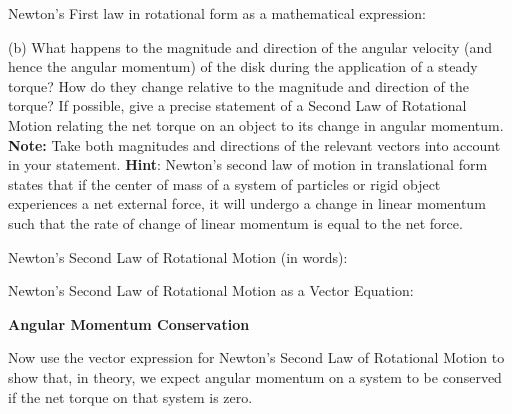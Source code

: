 Newton's First law in rotational form as a mathematical expression: 
\vspace{20mm}

(b) What happens to the magnitude and direction of the angular velocity (and
hence the angular momentum) of the disk during the application of a steady torque? How do they change relative to the magnitude and direction of the torque? If
possible, give a precise statement of a Second Law of Rotational Motion relating the net torque on an object to its change in angular momentum. \textbf{Note:}
Take both magnitudes and directions of the relevant vectors into account in
your statement. \textbf{Hint}: Newton's second law of motion in translational form states that if the center of mass
of a system of particles or rigid object experiences a net external force, it 
will undergo a change in linear momentum such that the rate of change of linear momentum is equal to the net force.

Newton's Second Law of Rotational Motion (in words):
\vspace{20mm}

Newton's Second Law of Rotational Motion as a Vector Equation:
\vspace{20mm}

\textbf{Angular Momentum Conservation }

Now use the vector expression for Newton's Second Law of Rotational
Motion to show that, in theory, we expect angular momentum on a system to be
conserved if the net torque on that system is zero.

